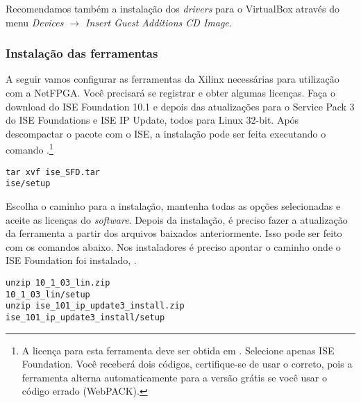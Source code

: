 Recomendamos também a instalação dos \emph{drivers} para o
VirtualBox através do menu \emph{Devices $\rightarrow$ Insert Guest
Additions CD Image}.

\subsubsection{Instalação das ferramentas}
\label{ssec:tools}

A seguir vamos configurar as ferramentas da Xilinx necessárias para
utilização com a NetFPGA.  Você precisará se registrar e obter
algumas licenças.  Faça o download do ISE Foundation 10.1 e depois
das atualizações para o Service Pack 3 do ISE Foundations e ISE IP
Update, todos para Linux 32-bit.  Após descompactar o pacote com o
ISE, a instalação pode ser feita executando o comando
.\footnote{A licença para esta ferramenta deve ser obtida
em 
.  Selecione apenas ISE
Foundation.  Você receberá dois códigos, certifique-se de usar o
correto, pois a ferramenta alterna automaticamente para a versão
grátis se você usar o código errado (WebPACK).}

\begin{verbatim}
tar xvf ise_SFD.tar
ise/setup
\end{verbatim}

Escolha o caminho  para a instalação, mantenha
todas as opções selecionadas e aceite as licenças do
\emph{software}.  Depois da instalação, é preciso fazer a
atualização da ferramenta a partir dos arquivos baixados
anteriormente. Isso pode ser feito com os comandos abaixo.  Nos
instaladores é preciso apontar o caminho onde o ISE Foundation foi
instalado, .

\begin{verbatim}
unzip 10_1_03_lin.zip
10_1_03_lin/setup
unzip ise_101_ip_update3_install.zip
ise_101_ip_update3_install/setup
\end{verbatim}

